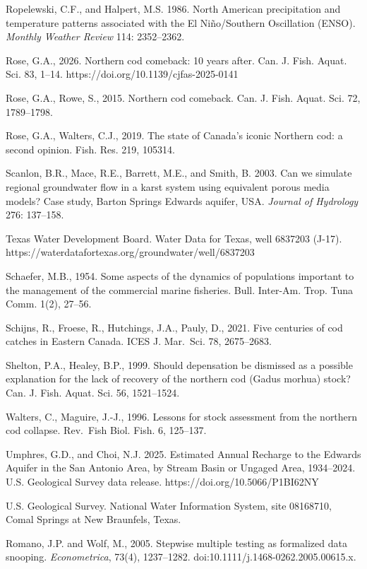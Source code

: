 \documentclass[11pt]{article}
\begin{document}
Ropelewski, C.F., and Halpert, M.S. 1986. North American precipitation
and temperature patterns associated with the El Ni\~no/Southern
Oscillation (ENSO). \emph{Monthly Weather Review} 114: 2352--2362.

Rose, G.A., 2026. Northern cod comeback: 10 years after. Can. J. Fish.
Aquat. Sci. 83, 1--14. https://doi.org/10.1139/cjfas-2025-0141

Rose, G.A., Rowe, S., 2015. Northern cod comeback. Can. J. Fish. Aquat.
Sci. 72, 1789--1798.

Rose, G.A., Walters, C.J., 2019. The state of Canada's iconic Northern
cod: a second opinion. Fish. Res. 219, 105314.

Scanlon, B.R., Mace, R.E., Barrett, M.E., and Smith, B. 2003. Can we
simulate regional groundwater flow in a karst system using equivalent
porous media models? Case study, Barton Springs Edwards aquifer, USA.
\emph{Journal of Hydrology} 276: 137--158.

Texas Water Development Board. Water Data for Texas, well 6837203
(J-17). https://waterdatafortexas.org/groundwater/well/6837203

Schaefer, M.B., 1954. Some aspects of the dynamics of populations
important to the management of the commercial marine fisheries. Bull.
Inter-Am. Trop. Tuna Comm. 1(2), 27--56.

Schijns, R., Froese, R., Hutchings, J.A., Pauly, D., 2021. Five
centuries of cod catches in Eastern Canada. ICES J. Mar.~Sci. 78,
2675--2683.

Shelton, P.A., Healey, B.P., 1999. Should depensation be dismissed as a
possible explanation for the lack of recovery of the northern cod (Gadus
morhua) stock? Can. J. Fish. Aquat. Sci. 56, 1521--1524.

Walters, C., Maguire, J.-J., 1996. Lessons for stock assessment from the
northern cod collapse. Rev.~Fish Biol. Fish. 6, 125--137.


Umphres, G.D., and Choi, N.J. 2025. Estimated Annual Recharge to the
Edwards Aquifer in the San Antonio Area, by Stream Basin or Ungaged
Area, 1934--2024. U.S. Geological Survey data release.
https://doi.org/10.5066/P1BI62NY

U.S. Geological Survey. National Water Information System, site
08168710, Comal Springs at New Braunfels, Texas.

Romano, J.P. and Wolf, M., 2005. Stepwise multiple testing as formalized data snooping.
\emph{Econometrica}, 73(4), 1237--1282. doi:10.1111/j.1468-0262.2005.00615.x.
\end{document}

